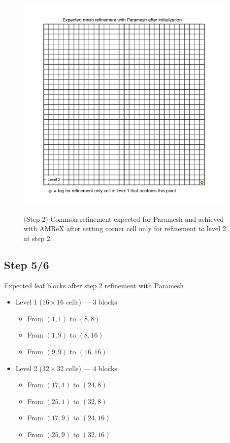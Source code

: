 \documentclass[12pt,letterpaper]{article}
\begin{document}
\begin{figure}[!hp]
\begin{center}
\includegraphics[width=4.25in]{TestRefine_Step2_Both.pdf}\\
\caption{(Step 2) Common refinement expected for Paramesh and achieved with AMReX after
setting corner cell only for refinement to level 2 at step 2.}
\end{center}
\end{figure}

\newpage
\subsection{Step 5/6}
Expected leaf blocks after step 2 refinement with Paramesh
\begin{itemize}
\item{Level 1 ($16 \times 16$ cells) --- 3 blocks}
    \begin{itemize}
    \item{From $( 1, 1)$ to $( 8, 8)$}
    \item{From $( 1, 9)$ to $( 8,16)$}
    \item{From $( 9, 9)$ to $(16,16)$}
    \end{itemize}
\item{Level 2 ($32 \times 32$ cells) --- 4 blocks}
    \begin{itemize}
    \item{From $(17,1)$ to $(24,8)$}
    \item{From $(25,1)$ to $(32,8)$}
    \item{From $(17,9)$ to $(24,16)$}
    \item{From $(25,9)$ to $(32,16)$}
    \end{itemize}
\end{itemize}
\end{document}
